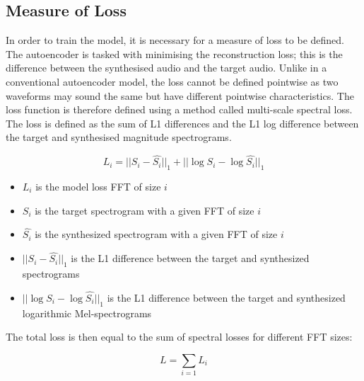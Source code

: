 \subsection{Measure of Loss}
\label{sec:loss_measure}

In order to train the model, it is necessary for a measure of loss to be defined. The autoencoder is tasked with minimising the reconstruction loss; this is the difference between the synthesised audio and the target audio. Unlike in a conventional autoencoder model, the loss cannot be defined pointwise as two waveforms may sound the same but have different pointwise characteristics. The loss function is therefore defined using a method called multi-scale spectral loss. The loss is defined as the sum of L1 differences and the L1 log difference between the target and synthesised magnitude spectrograms.

\vspace{0.5cm}
\vspace{0.5cm}

\begin{equation}
    L_i = ||S_i - \hat{S_i}||_1 + ||\log{S_i} - \log\hat{S_i}||_1
\end{equation}

\begin{itemize}
    \item $L_i$ is the model loss FFT of size $i$
    \item $S_i$ is the target spectrogram with a given FFT of size $i$
    \item $\hat{S_i}$ is the synthesized spectrogram with a given FFT of size $i$
    \item $||S_i - \hat{S_i}||_1$ is the L1 difference between the target and synthesized spectrograms
    \item $||\log{S_i} - \log\hat{S_i}||_1$ is the L1 difference between the target and synthesized logarithmic Mel-spectrograms
\end{itemize}

The total loss is then equal to the sum of spectral losses for different FFT sizes:

\begin{equation}
    L = \sum_{i=1} L_i
\end{equation}


